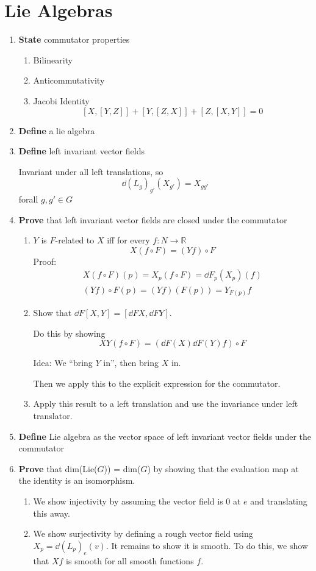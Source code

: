 \documentclass[prb,12pt]{revtex4-2}
\theoremstyle{definition}
\theoremstyle{definition}
\newcommand{\R}{\mathbb{R}}
\begin{document}
\section{Lie Algebras}
\begin{enumerate}[resume]
	\item \textbf{State} commutator properties
	\begin{enumerate}[label=(\alph*)]
		\item Bilinearity
		\item Anticommutativity
		\item Jacobi Identity
		\[[X,[Y,Z]]+[Y,[Z,X]]+[Z,[X,Y]]=0\]
	\end{enumerate}
		\item \textbf{Define} a lie algebra
	\item \textbf{Define} left invariant vector fields
	
	Invariant under all left translations, so
	\[\dd{(L_g)_{g'}}(X_{g'})=X_{gg'}\]
	forall $g,g'\in G$
	\item \textbf{Prove} that left invariant vector fields are closed under the commutator
	\begin{enumerate}[label=(\alph*)]
	\item $Y$ is $F$-related to $X$ iff for every $f:N\to \R$
	\[X(f\circ F)=(Yf)\circ F\]
	Proof:
	\begin{gather*}
		X(f\circ F)(p)=X_p(f\circ F)=\dd{F}_p(X_p)(f)\\
		(Yf)\circ F(p)=(Yf)(F(p))=Y_{F(p)}f
	\end{gather*}
	\item Show that $\dd{F}[X,Y] = [\dd{F}X,\dd{F}Y]$.
	
	Do this by showing
	\[XY(f\circ F) = (\dd{F}(X)\dd{F}(Y)f)\circ F\]

Idea: We ``bring $Y$ in'', then bring $X$ in.

Then we apply this to the explicit expression for the commutator.
	\item Apply this result to a left translation and use the invariance under left translator.
\end{enumerate}
\item \textbf{Define} Lie algebra as the vector space of left invariant vector fields under the commutator
	\item \textbf{Prove} that dim(Lie($G$)) = dim($G$) by showing that the evaluation map at the identity is an isomorphism.
	\begin{enumerate}[label=(\alph*)]
		\item We show injectivity by assuming the vector field is 0 at $e$ and translating this away.
		\item We show surjectivity by defining a rough vector field using $X_p =\dd{(L_p)_e}(v)$. It remains to show it is smooth. To do this, we show that $Xf$ is smooth for all smooth functions $f$.
		

\end{enumerate}
\end{enumerate}
\end{document}

